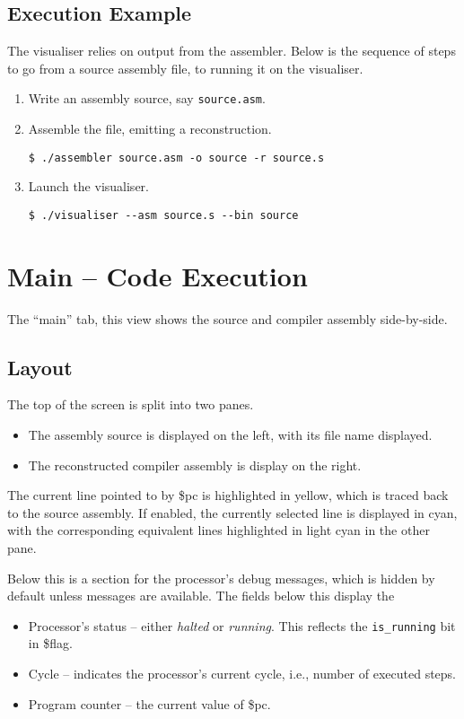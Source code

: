 \documentclass[10pt]{article}
\begin{document}
    \subsection{Execution Example}

    The visualiser relies on output from the assembler.
    Below is the sequence of steps to go from a source assembly file, to running it on the visualiser.
    \begin{enumerate}
        \item Write an assembly source, say \texttt{source.asm}.
        \item Assemble the file, emitting a reconstruction.
        \medskip
        \begin{lstlisting}[style=bashconsole]
$ ./assembler source.asm -o source -r source.s
        \end{lstlisting}
        \item Launch the visualiser.
        \medskip
        \begin{lstlisting}[style=bashconsole]
$ ./visualiser --asm source.s --bin source
        \end{lstlisting}
    \end{enumerate}

    \section{Main -- Code Execution}

    The ``main'' tab, this view shows the source and compiler assembly side-by-side.

    \subsection{Layout}

    The top of the screen is split into two panes.
    \begin{itemize}
        \item The assembly source is displayed on the left, with its file name displayed.
        \item The reconstructed compiler assembly is display on the right.
    \end{itemize}
    The current line pointed to by \$pc is highlighted in yellow, which is traced back to the source assembly.
    If enabled, the currently selected line is displayed in cyan, with the corresponding equivalent lines highlighted in light cyan in the other pane.

    Below this is a section for the processor's debug messages, which is hidden by default unless messages are available.
    The fields below this display the
    \begin{itemize}
        \item Processor's status -- either \textit{halted} or \textit{running}.
        This reflects the \texttt{is\_running} bit in \$flag.
        \item Cycle -- indicates the processor's current cycle, i.e., number of executed steps.
        \item Program counter -- the current value of \$pc.
    \end{itemize}
\end{document}
